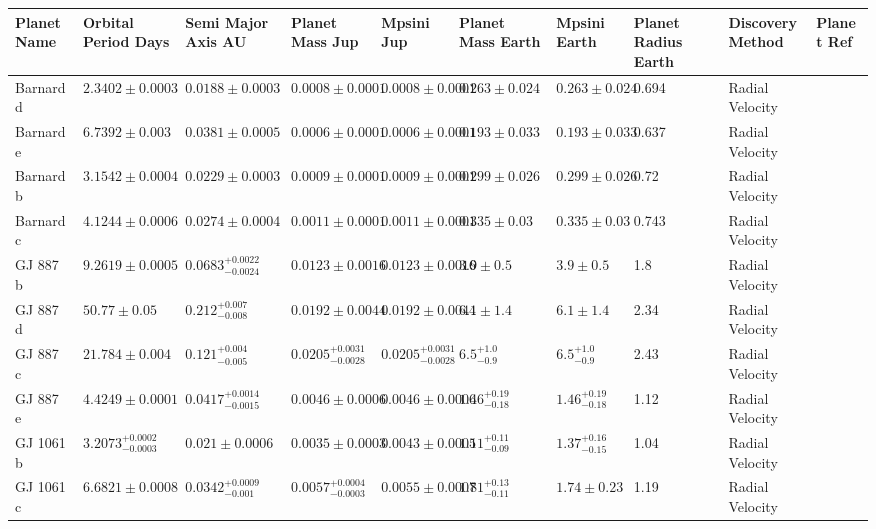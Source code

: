 \begin{tabular}{llllllllll}
\toprule
Planet Name & Orbital Period Days & Semi Major Axis AU & Planet Mass Jup & Mpsini Jup & Planet Mass Earth & Mpsini Earth & Planet Radius Earth & Discovery Method & Planet Ref \\
\midrule
Barnard d & $2.3402 \pm 0.0003$ & $0.0188 \pm 0.0003$ & $0.0008 \pm 0.0001$ & $0.0008 \pm 0.0001$ & $0.263 \pm 0.024$ & $0.263 \pm 0.024$ & 0.694 & Radial Velocity & \cite{BASANT_ET_AL__2025} \\
Barnard e & $6.7392 \pm 0.003$ & $0.0381 \pm 0.0005$ & $0.0006 \pm 0.0001$ & $0.0006 \pm 0.0001$ & $0.193 \pm 0.033$ & $0.193 \pm 0.033$ & 0.637 & Radial Velocity & \cite{BASANT_ET_AL__2025} \\
Barnard b & $3.1542 \pm 0.0004$ & $0.0229 \pm 0.0003$ & $0.0009 \pm 0.0001$ & $0.0009 \pm 0.0001$ & $0.299 \pm 0.026$ & $0.299 \pm 0.026$ & 0.72 & Radial Velocity & \cite{BASANT_ET_AL__2025} \\
Barnard c & $4.1244 \pm 0.0006$ & $0.0274 \pm 0.0004$ & $0.0011 \pm 0.0001$ & $0.0011 \pm 0.0001$ & $0.335 \pm 0.03$ & $0.335 \pm 0.03$ & 0.743 & Radial Velocity & \cite{BASANT_ET_AL__2025} \\
GJ 887 b & $9.2619 \pm 0.0005$ & $0.0683^{+0.0022}_{-0.0024}$ & $0.0123 \pm 0.0016$ & $0.0123 \pm 0.0016$ & $3.9 \pm 0.5$ & $3.9 \pm 0.5$ & 1.8 & Radial Velocity & \cite{HARTOGH_ET_AL_2026} \\
GJ 887 d & $50.77 \pm 0.05$ & $0.212^{+0.007}_{-0.008}$ & $0.0192 \pm 0.0044$ & $0.0192 \pm 0.0044$ & $6.1 \pm 1.4$ & $6.1 \pm 1.4$ & 2.34 & Radial Velocity & \cite{HARTOGH_ET_AL_2026} \\
GJ 887 c & $21.784 \pm 0.004$ & $0.121^{+0.004}_{-0.005}$ & $0.0205^{+0.0031}_{-0.0028}$ & $0.0205^{+0.0031}_{-0.0028}$ & $6.5^{+1.0}_{-0.9}$ & $6.5^{+1.0}_{-0.9}$ & 2.43 & Radial Velocity & \cite{HARTOGH_ET_AL_2026} \\
GJ 887 e & $4.4249 \pm 0.0001$ & $0.0417^{+0.0014}_{-0.0015}$ & $0.0046 \pm 0.0006$ & $0.0046 \pm 0.0006$ & $1.46^{+0.19}_{-0.18}$ & $1.46^{+0.19}_{-0.18}$ & 1.12 & Radial Velocity & \cite{HARTOGH_ET_AL_2026} \\
GJ 1061 b & $3.2073^{+0.0002}_{-0.0003}$ & $0.021 \pm 0.0006$ & $0.0035 \pm 0.0003$ & $0.0043 \pm 0.0005$ & $1.11^{+0.11}_{-0.09}$ & $1.37^{+0.16}_{-0.15}$ & 1.04 & Radial Velocity & \cite{DREIZLER_ET_AL_2025} \\
GJ 1061 c & $6.6821 \pm 0.0008$ & $0.0342^{+0.0009}_{-0.001}$ & $0.0057^{+0.0004}_{-0.0003}$ & $0.0055 \pm 0.0007$ & $1.81^{+0.13}_{-0.11}$ & $1.74 \pm 0.23$ & 1.19 & Radial Velocity & \cite{DREIZLER_ET_AL_2025} \\

\end{tabular}
